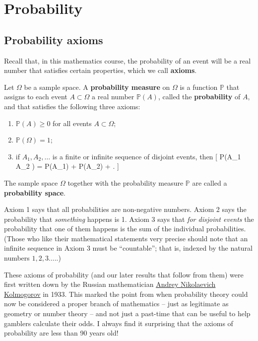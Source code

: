 \documentclass[
  letterpaper,
  DIV=11,
  numbers=noendperiod]{scrreprt}
\providecommand{\tightlist}{%
  \setlength{\itemsep}{0pt}\setlength{\parskip}{0pt}}\usepackage{longtable,booktabs,array}
\theoremstyle{remark}
\begin{document}
\hypertarget{L04-probability}{%
\chapter{Probability}\label{L04-probability}}

\hypertarget{axioms}{%
\section{Probability axioms}\label{axioms}}

Recall that, in this mathematics course, the probability of an event
will be a real number that satisfies certain properties, which we call
\textbf{axioms}.

\leavevmode{}%
Let \(\Omega\) be a sample space. A \textbf{probability measure} on
\(\Omega\) is a function \(\mathbb P\) that assigns to each event
\(A \subset \Omega\) a real number \(\mathbb P(A)\), called the
\textbf{probability} of \(A\), and that satisfies the following three
axioms:

\begin{enumerate}
\def\labelenumi{\arabic{enumi}.}
\tightlist
\item
  \(\mathbb P(A) \geq 0\) for all events \(A \subset \Omega\);
\item
  \(\mathbb P(\Omega) = 1\);
\item
  if \(A_1, A_2, \dots\) is a finite or infinite sequence of disjoint
  events, then {[} \mathbb P(A\_1 \cup A\_2 \cup \cdots) =
  \mathbb P(A\_1) + \mathbb P(A\_2) + \cdots . {]}
\end{enumerate}

The sample space \(\Omega\) together with the probability measure
\(\mathbb P\) are called a \textbf{probability space}.

Axiom 1 says that all probabilities are non-negative numbers. Axiom 2
says the probability that \emph{something} happens is 1. Axiom 3 says
that \emph{for disjoint events} the probability that one of them happens
is the sum of the individual probabilities. (Those who like their
mathematical statements very precise should note that an infinite
sequence in Axiom 3 must be ``countable''; that is, indexed by the
natural numbers \(1, 2, 3. \dots\).)

These axioms of probability (and our later results that follow from
them) were first written down by the Russian mathematician
\href{https://mathshistory.st-andrews.ac.uk/Biographies/Kolmogorov/}{Andrey
Nikolaevich Kolmogorov} in 1933. This marked the point from when
probability theory could now be considered a proper branch of
mathematics -- just as legitimate as geometry or number theory -- and
not just a past-time that can be useful to help gamblers calculate their
odds. I always find it surprising that the axioms of probability are
less than 90 years old!
\end{document}
